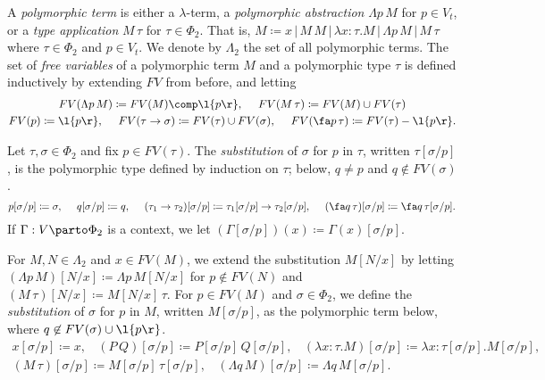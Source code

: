 \documentclass[reqno]{amsart}
\begin{document}
    \begin{definition}
        A \textit{polymorphic term} is either a $\lambda$-term, a \textit{polymorphic abstraction} $\Lambda p\,M$ for $p\in V_t$, or a \textit{type application} $M\,\tau$ for $\tau\in\Phi_2$. That is, $M\coloneqq x\,|\,M\,M\,|\,\lambda x\!:\!\tau.M\,|\,\Lambda p\,M\,|\,M\,\tau$ where $\tau\in\Phi_2$ and $p\in V_t$. We denote by $\Lambda_2$ the set of all polymorphic terms. The set of \textit{free variables} of a polymorphic term $M$ and a polymorphic type $\tau$ is defined inductively by extending $FV$ from before, and letting
        \begin{equation*}
            \begin{gathered}
                FV(\Lambda p\,M)\coloneqq FV(M)\comp\l\{p\r\},\ \ \ \ FV(M\,\tau)\coloneqq FV(M)\cup FV(\tau) \\
                FV(p)\coloneqq\l\{p\r\},\ \ \ \ FV(\tau\rightarrow\sigma)\coloneqq FV(\tau)\cup FV(\sigma),\ \ \ \ FV(\fa p\,\tau)\coloneqq FV(\tau)-\l\{p\r\}.
            \end{gathered}
        \end{equation*}
    \end{definition}

    \begin{definition}
        Let $\tau,\sigma\in\Phi_2$ and fix $p\in FV(\tau)$. The \textit{substitution} of $\sigma$ for $p$ in $\tau$, written $\tau[\sigma/p]$, is the polymorphic type defined by induction on $\tau$; below, $q\neq p$ and $q\not\in FV(\sigma)$.
        \begin{equation*}
            p[\sigma/p]\coloneqq\sigma,\ \ \ \ q[\sigma/p]\coloneqq q,\ \ \ \ (\tau_1\rightarrow\tau_2)[\sigma/p]\coloneqq\tau_1[\sigma/p]\rightarrow\tau_2[\sigma/p],\ \ \ \ (\fa q\,\tau)[\sigma/p]\coloneqq\fa q\,\tau[\sigma/p].
        \end{equation*}
        If $\Gamma:V\parto\Phi_2$ is a context, we let $(\Gamma[\sigma/p])(x)\coloneqq\Gamma(x)[\sigma/p]$.
    \end{definition}

    \begin{definition}
        For $M,N\in\Lambda_2$ and $x\in FV(M)$, we extend the substitution $M[N/x]$ by letting $(\Lambda p\,M)[N/x]\coloneqq\Lambda p\,M[N/x]$ for $p\not\in FV(N)$ and $(M\,\tau)[N/x]\coloneqq M[N/x]\,\tau$. For $p\in FV(M)$ and $\sigma\in\Phi_2$, we define the \textit{substitution} of $\sigma$ for $p$ in $M$, written $M[\sigma/p]$, as the polymorphic term below, where $q\not\in FV(\sigma)\cup\l\{p\r\}$.
        \begin{equation*}
            \begin{gathered}
                x[\sigma/p]\coloneqq x,\ \ \ \ (P\,Q)[\sigma/p]\coloneqq P[\sigma/p]\,Q[\sigma/p],\ \ \ \ (\lambda x\!:\!\tau.M)[\sigma/p]\coloneqq\lambda x\!:\!{\tau[\sigma/p]}.M[\sigma/p],\\
                (M\,\tau)[\sigma/p]\coloneqq M[\sigma/p]\,\tau[\sigma/p],\ \ \ \ (\Lambda q\,M)[\sigma/p]\coloneqq\Lambda q\,M[\sigma/p].
            \end{gathered}
        \end{equation*}
    \end{definition}
\end{document}
